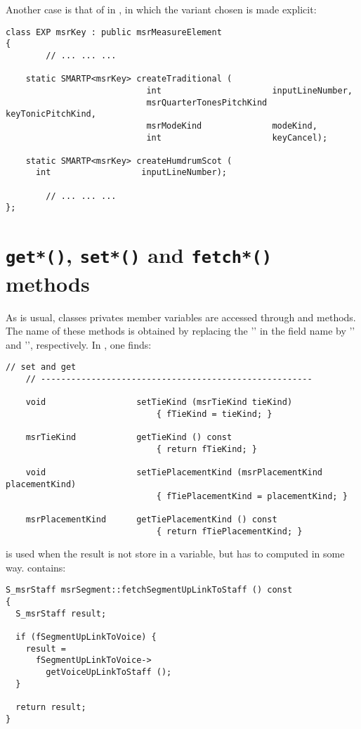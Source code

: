 Another case is that of  in , in which the variant chosen is made explicit:
\begin{lstlisting}[language=CPlusPlus]
class EXP msrKey : public msrMeasureElement
{
		// ... ... ...

    static SMARTP<msrKey> createTraditional (
                            int                      inputLineNumber,
                            msrQuarterTonesPitchKind keyTonicPitchKind,
                            msrModeKind              modeKind,
                            int                      keyCancel);

    static SMARTP<msrKey> createHumdrumScot (
      int                  inputLineNumber);

		// ... ... ...
};
\end{lstlisting}


\section{{\tt get*()}, {\tt set*()} and {\tt fetch*()} methods}

As is usual, classes privates member variables are accessed through  and  methods. The name of these methods is obtained by replacing the '' in the field name by '' and '', respectively. In , one finds:
\begin{lstlisting}[language=CPlusPlus]
    // set and get
    // ------------------------------------------------------

    void                  setTieKind (msrTieKind tieKind)
                              { fTieKind = tieKind; }

    msrTieKind            getTieKind () const
                              { return fTieKind; }

    void                  setTiePlacementKind (msrPlacementKind placementKind)
                              { fTiePlacementKind = placementKind; }

    msrPlacementKind      getTiePlacementKind () const
                              { return fTiePlacementKind; }
\end{lstlisting}


 is used when the result is not store in a variable, but has to computed in some way.  contains:
\begin{lstlisting}[language=CPlusPlus]
S_msrStaff msrSegment::fetchSegmentUpLinkToStaff () const
{
  S_msrStaff result;

  if (fSegmentUpLinkToVoice) {
    result =
      fSegmentUpLinkToVoice->
        getVoiceUpLinkToStaff ();
  }

  return result;
}
\end{lstlisting}

